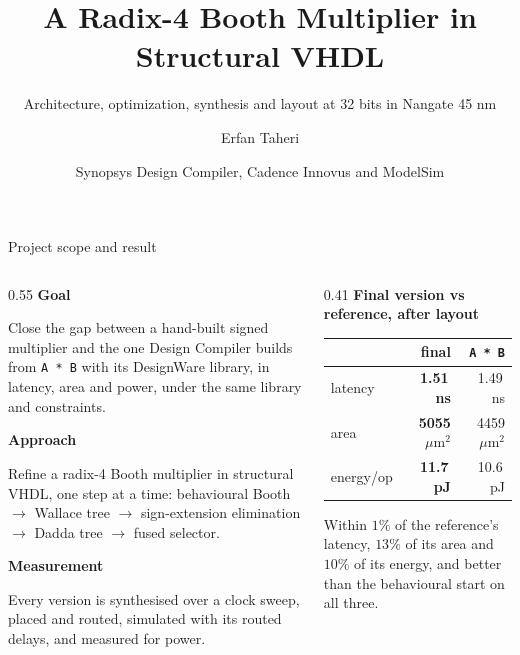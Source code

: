 \documentclass[aspectratio=169,11pt]{beamer}
\title{A Radix-4 Booth Multiplier in Structural VHDL}
\subtitle{Architecture, optimization, synthesis and layout at 32 bits in Nangate 45 nm}
\author{Erfan Taheri}
\date{Synopsys Design Compiler, Cadence Innovus and ModelSim}
\newcommand{\umarea}{\ensuremath{\,\mu\mathrm{m}^{2}}}
\begin{document}
\begin{frame}[plain]
  \titlepage
\end{frame}

\begin{frame}{Project scope and result}

\begin{columns}[T]
\begin{column}{0.55\textwidth}
\small
\textbf{Goal}\par
Close the gap between a hand-built signed multiplier and the one Design
Compiler builds from \texttt{A * B} with its DesignWare library, in latency,
area and power, under the same library and constraints.

\vspace{8pt}
\textbf{Approach}\par
Refine a radix-4 Booth multiplier in structural VHDL, one step at a time:
behavioural Booth $\rightarrow$ Wallace tree $\rightarrow$ sign-extension
elimination $\rightarrow$ Dadda tree $\rightarrow$ fused selector.

\vspace{8pt}
\textbf{Measurement}\par
Every version is synthesised over a clock sweep, placed and routed, simulated
with its routed delays, and measured for power.
\end{column}

\begin{column}{0.41\textwidth}
\footnotesize
\textbf{Final version vs reference, after layout}

\vspace{4pt}
\begin{tabular}{@{}lrr@{}}
 & final & \texttt{A * B} \\
\midrule
latency & \textbf{1.51\,ns} & 1.49\,ns \\
area & \textbf{5055\umarea} & 4459\umarea \\
energy/op & \textbf{11.7\,pJ} & 10.6\,pJ \\
\end{tabular}

\vspace{10pt}
\footnotesize
Within $1\%$ of the reference's latency, $13\%$ of its area and $10\%$ of its
energy, and better than the behavioural start on all three.
\end{column}
\end{columns}

\end{frame}
\end{document}
